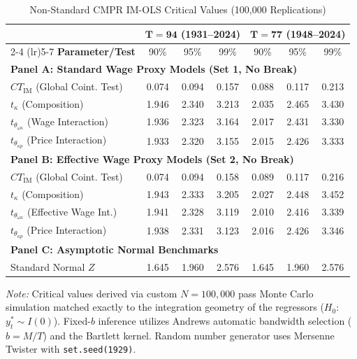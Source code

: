 \begin{table}[H]
\centering
\begin{threeparttable}
\caption{Non-Standard CMPR IM-OLS Critical Values (100,000 Replications)}
\label{tab:s32_cvs}
\scriptsize
\begin{tabular}{l | ccc | ccc}
\toprule
 & \multicolumn{3}{c|}{$\boldsymbol{T=94}$ \textbf{(1931--2024)}} & \multicolumn{3}{c}{$\boldsymbol{T=77}$ \textbf{(1948--2024)}} \\
\cmidrule(lr){2-4} \cmidrule(lr){5-7}
\textbf{Parameter/Test} & 90\% & 95\% & 99\% & 90\% & 95\% & 99\% \\
\midrule
\multicolumn{7}{l}{\textbf{Panel A: Standard Wage Proxy Models (Set 1, No Break)}} \\
$CT_{\text{IM}}$ (Global Coint. Test) & 0.074 & 0.094 & 0.157 & 0.088 & 0.117 & 0.213 \\
$t_{\kappa}$ (Composition) & 1.946 & 2.340 & 3.213 & 2.035 & 2.465 & 3.430 \\
$t_{\theta_{\omega\kappa}}$ (Wage Interaction) & 1.936 & 2.323 & 3.164 & 2.017 & 2.431 & 3.330 \\
$t_{\theta_{\kappa p}}$ (Price Interaction) & 1.933 & 2.320 & 3.155 & 2.015 & 2.426 & 3.333 \\
\midrule
\multicolumn{7}{l}{\textbf{Panel B: Effective Wage Proxy Models (Set 2, No Break)}} \\
$CT_{\text{IM}}$ (Global Coint. Test) & 0.074 & 0.094 & 0.158 & 0.089 & 0.117 & 0.216 \\
$t_{\kappa}$ (Composition) & 1.943 & 2.333 & 3.205 & 2.027 & 2.448 & 3.452 \\
$t_{\theta_{\omega\kappa}}$ (Effective Wage Int.) & 1.941 & 2.328 & 3.119 & 2.010 & 2.416 & 3.339 \\
$t_{\theta_{\kappa p}}$ (Price Interaction) & 1.938 & 2.331 & 3.123 & 2.016 & 2.426 & 3.346 \\
\midrule
\multicolumn{7}{l}{\textbf{Panel C: Asymptotic Normal Benchmarks}} \\
Standard Normal $Z$ & 1.645 & 1.960 & 2.576 & 1.645 & 1.960 & 2.576 \\
\bottomrule
\end{tabular}
\begin{tablenotes}
\item \textit{Note:} Critical values derived via custom $N=100,000$ pass Monte Carlo simulation matched exactly to the integration geometry of the regressors ($H_0$: $y^*_t \sim I(0)$). Fixed-$b$ inference utilizes Andrews automatic bandwidth selection ($b = M/T$) and the Bartlett kernel. Random number generator uses Mersenne Twister with \texttt{set.seed(1929)}.
\end{tablenotes}
\end{threeparttable}
\end{table}
